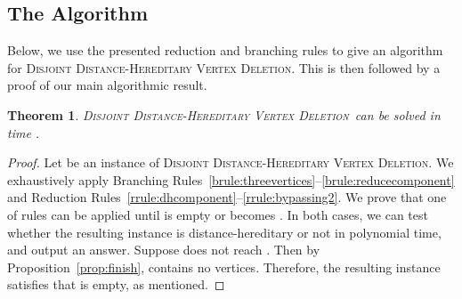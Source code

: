 \documentclass[11pt]{elsarticle}
\newtheorem{theorem}{Theorem}[section]
\newcommand{\disjointDHVD}{\textsc{Disjoint Distance-Hereditary Vertex Deletion}}
\begin{document}
\subsection{The Algorithm}
Below, we use the presented reduction and branching rules to give an algorithm for \disjointDHVD. This is then followed by a proof of our main algorithmic result.




\begin{theorem}
\label{thm:main2}
\disjointDHVD\ can be solved in time .
\end{theorem}
\begin{proof}
Let  be an instance of \disjointDHVD. 
We exhaustively apply Branching Rules~\ref{brule:threevertices}--\ref{brule:reducecomponent} and Reduction Rules~\ref{rrule:dhcomponent}--\ref{rrule:bypassing2}.
We prove that one of rules can be applied until  is empty or  becomes .
In both cases, we can test whether the resulting instance is distance-hereditary or not in polynomial time, and output an answer.
Suppose  does not reach . Then by Proposition~\ref{prop:finish},  contains no vertices.
Therefore, the resulting instance satisfies that  is empty, as mentioned. 







\end{proof}
\end{document}
